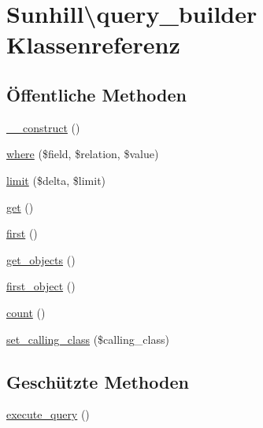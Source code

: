 \hypertarget{classSunhill_1_1query__builder}{}\section{Sunhill\textbackslash{}query\+\_\+builder Klassenreferenz}
\label{classSunhill_1_1query__builder}
\subsection*{Öffentliche Methoden}
\begin{DoxyCompactItemize}
\item 
\hyperlink{classSunhill_1_1query__builder_a518103039d35b27e746b3fab81ba2eac}{\+\_\+\+\_\+construct} ()
\item 
\hyperlink{classSunhill_1_1query__builder_aff0579e52e01fc4362d78b89e4a6e345}{where} (\$field, \$relation, \$value)
\item 
\hyperlink{classSunhill_1_1query__builder_a6b9d556812567a42f01d90f0bdc01b1d}{limit} (\$delta, \$limit)
\item 
\hyperlink{classSunhill_1_1query__builder_a8de2fbcb68af623adcb903864dc6205c}{get} ()
\item 
\hyperlink{classSunhill_1_1query__builder_a7a1fb402cc5183f5f1422833126056a4}{first} ()
\item 
\hyperlink{classSunhill_1_1query__builder_adbb52ea9be5416a7e5f5aac02583947f}{get\+\_\+objects} ()
\item 
\hyperlink{classSunhill_1_1query__builder_a07ef71d5e2f3638670874f5ca9e7f49e}{first\+\_\+object} ()
\item 
\hyperlink{classSunhill_1_1query__builder_aeebb99255857d8ffb7e2178a39da7cdd}{count} ()
\item 
\hyperlink{classSunhill_1_1query__builder_a691657369d4445b051c66323a436ef7c}{set\+\_\+calling\+\_\+class} (\$calling\+\_\+class)
\end{DoxyCompactItemize}
\subsection*{Geschützte Methoden}
\begin{DoxyCompactItemize}
\item 
\hyperlink{classSunhill_1_1query__builder_a995f2aa942172d8d185296d096276ec0}{execute\+\_\+query} ()
\end{DoxyCompactItemize}
